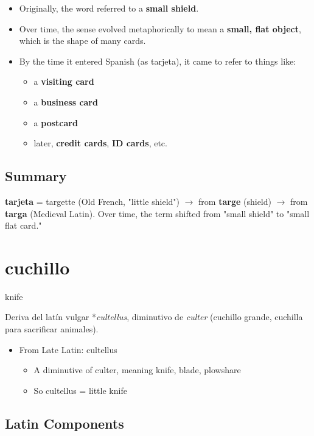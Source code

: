 \documentclass[10pt]{book}
\newcommand{\wordentry}[2]{
	\large #1
	\vspace{-0.5em}
	\begin{etymologybox}
		#2
	\end{etymologybox}
}
\let\oldsection\section
\renewcommand{\section}[1]{
	\needspace{8\baselineskip}
	\oldsection{#1}
}
\begin{document}
	\begin{itemize}
		\item Originally, the word referred to a \textbf{small shield}.
		\item Over time, the sense evolved metaphorically to mean a \textbf{small, flat object}, which is the shape of many cards.
		\item By the time it entered Spanish (as tarjeta), it came to refer to things like:
		\begin{itemize}
			\item a \textbf{visiting card}
			\item a \textbf{business card}
			\item a \textbf{postcard}
			\item later, \textbf{credit cards}, \textbf{ID cards}, etc.
		\end{itemize}
	\end{itemize}
	
	\subsection*{Summary}
	
	\textbf{tarjeta} = targette (Old French, "little shield") $\rightarrow$ from \textbf{targe} (shield) $\rightarrow$ from \textbf{targa} (Medieval Latin).
	Over time, the term shifted from "small shield" to "small flat card."
	
	
	\section{cuchillo}
	
	\wordentry{knife}{
	Deriva del latín vulgar *\textit{cultellus}, diminutivo de \textit{culter} (cuchillo grande, cuchilla para sacrificar animales).
	\begin{itemize}
		\item From Late Latin: cultellus
		\begin{itemize}
			\item A diminutive of culter, meaning knife, blade, plowshare
			\item So cultellus = little knife
		\end{itemize}
	\end{itemize}
	}
	
	\subsection*{Latin Components}
	
\end{document}
